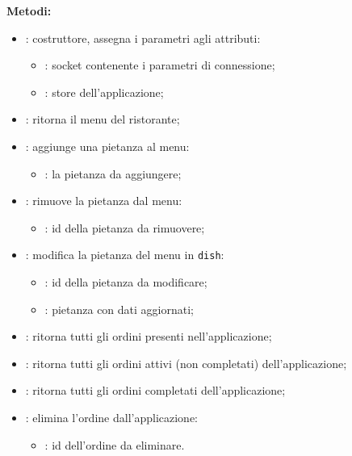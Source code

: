 \textbf{Metodi:}
\begin{itemize}
	\item {}: costruttore, assegna i parametri agli attributi:
	\begin{itemize}
		\item {}: socket contenente i parametri di connessione;
		\item {}: store dell'applicazione;
	\end{itemize}
	\item {}: ritorna il menu del ristorante;
	\item {}: aggiunge una pietanza al menu:
	\begin{itemize}
		\item {}: la pietanza da aggiungere;
	\end{itemize}
	\item {}: rimuove la pietanza dal menu:
	\begin{itemize}
		\item {}: id della pietanza da rimuovere;
	\end{itemize}
	\item {}: modifica la pietanza del menu in \texttt{dish}:
	\begin{itemize}
		\item {}: id della pietanza da modificare;
		\item {}: pietanza con dati aggiornati;
	\end{itemize}
	\item {}: ritorna tutti gli ordini presenti nell'applicazione;
	\item {}: ritorna tutti gli ordini attivi (non completati) dell'applicazione;
	\item {}: ritorna tutti gli ordini completati dell'applicazione;
	\item {}: elimina l'ordine dall'applicazione:
	\begin{itemize}
		\item {}: id dell'ordine da eliminare.
	\end{itemize}
\end{itemize}

